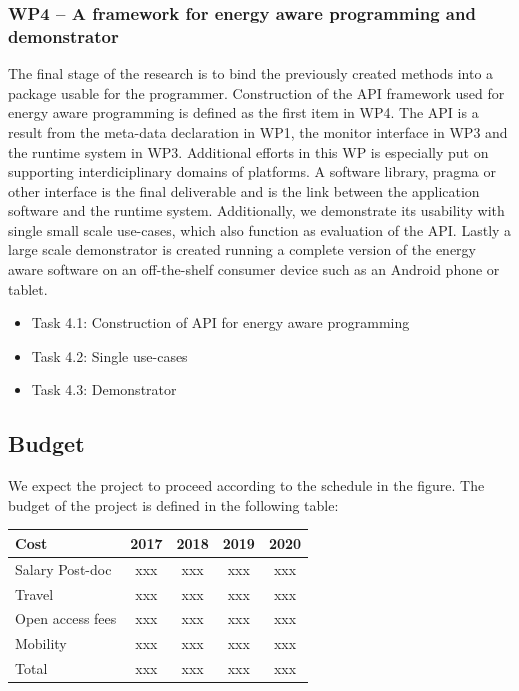 \documentclass{article}
\begin{document}
\subsubsection{WP4 -- A framework for energy aware programming and demonstrator}
The final stage of the research is to bind the previously created methods into a package usable for the programmer.
Construction of the API framework used for energy aware programming is defined as the first item in WP4.
The API is a result from the meta-data declaration in WP1, the monitor interface in WP3 and the runtime system in WP3.
Additional efforts in this WP is especially put on supporting interdiciplinary domains of platforms.
A software library, pragma or other interface is the final deliverable and is the link between the application software and the runtime system.
Additionally, we demonstrate its usability with single small scale use-cases, which also function as evaluation of the API.
Lastly a large scale demonstrator is created running a complete version of the energy aware software on an off-the-shelf consumer device such as an Android phone or tablet.

\begin{itemize}
 \item Task 4.1: Construction of API for energy aware programming \vspace{-0.3cm}
 \item Task 4.2: Single use-cases \vspace{-0.3cm}
 \item Task 4.3: Demonstrator
\end{itemize}


\subsection{Budget}
We expect the project to proceed according to the schedule in the figure.
The budget of the project is defined in the following table:
\begin{table}[h]
\begin{center}
\begin{tabular}{ | l | c | c |c |c |}
\hline
{Cost} & {2017} & {2018} & {2019} & {2020} \\ \hline
{Salary Post-doc} & xxx & xxx & xxx & xxx \\ \hline
{Travel} & xxx & xxx & xxx & xxx  \\ \hline
{Open access fees} & xxx & xxx & xxx & xxx  \\ \hline
{Mobility} & xxx & xxx & xxx & xxx  \\ \hline
{Total} & xxx & xxx & xxx & xxx  \\ \hline
\end{tabular}
\label{tab:strconf}
\end{center}

\end{table}
\end{document}
